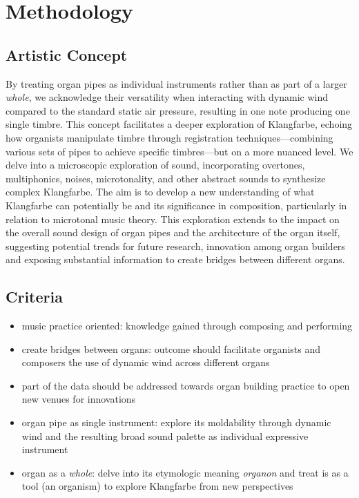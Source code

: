 \chapter{Methodology}

\section{Artistic Concept}

By treating organ pipes as individual instruments rather than as part of a larger \textit{whole}, we acknowledge their versatility when interacting with dynamic wind compared to the standard static air pressure, resulting in one note producing one single timbre. This concept facilitates a deeper exploration of Klangfarbe, echoing how organists manipulate timbre through registration techniques—combining various sets of pipes to achieve specific timbres—but on a more nuanced level. We delve into a microscopic exploration of sound, incorporating overtones, multiphonics, noises, microtonality, and other abstract sounds to synthesize complex Klangfarbe. The aim is to develop a new understanding of what Klangfarbe can potentially be and its significance in composition, particularly in relation to microtonal music theory. This exploration extends to the impact on the overall sound design of organ pipes and the architecture of the organ itself, suggesting potential trends for future research, innovation among organ builders and exposing substantial information to create bridges between different organs. 

\section{Criteria}

\begin{itemize}
\item music practice oriented: knowledge gained through composing and performing 
\item create bridges between organs: outcome should facilitate organists and composers the use of dynamic wind across different organs
\item part of the data should be addressed towards organ building practice to open new venues for innovations
\item organ pipe as single instrument: explore its moldability through dynamic wind and the resulting broad sound palette as individual expressive instrument 
\item organ as a \textit{whole}:  delve into its etymologic meaning \textit{organon} and treat is as a tool (an organism) to explore Klangfarbe from new perspectives
\end{itemize}

